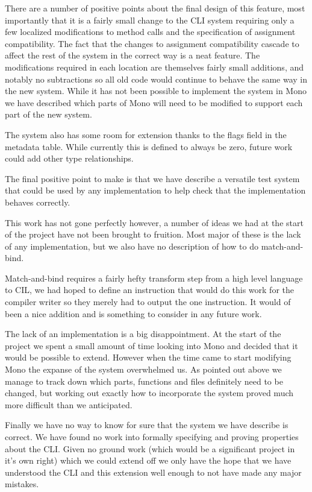 \documentclass[english]{report}
\begin{document}
There are a number of positive points about the final design of this feature, most importantly 
that it is a fairly small change to the CLI system requiring only a few localized modifications 
to method calls and the specification of assignment compatibility. The fact that the changes to
assignment compatibility cascade to affect the rest of the system in the correct way is a neat 
feature. The modifications required in each location are themselves fairly small additions, and 
notably no subtractions so all old code would continue to behave the same way in the new system.
While it has not been possible to implement the system in Mono we have described which parts of 
Mono will need to be modified to support each part of the new system.

The system also has some room for extension thanks to the flags field in the metadata table. 
While currently this is defined to always be zero, future work could add other type relationships.

The final positive point to make is that we have describe a versatile test system that could be
used by any implementation to help check that the implementation behaves correctly.

This work has not gone perfectly however, a number of ideas we had at the start of the project 
have not been brought to fruition. Most major of these is the lack of any implementation, but 
we also have no description of how to do match-and-bind.

Match-and-bind requires a fairly hefty transform step from a high level language to CIL, we had 
hoped to define an instruction that would do this work for the compiler writer so they merely had 
to output the one instruction. It would of been a nice addition and is something to consider in any
future work.

The lack of an implementation is a big disappointment. At the start of the project we spent a small amount 
of time looking into Mono and decided that it would be possible to extend. However when the time came 
to start modifying Mono the expanse of the system overwhelmed us. As pointed out above we manage to track down
which parts, functions and files definitely need to be changed, but working out exactly how to incorporate the 
system proved much more difficult than we anticipated.

Finally we have no way to know for sure that the system we have describe is correct. We have found no work 
into formally specifying and proving properties about the CLI. Given no ground work (which would be a significant
project in it's own right) which we could extend off we only have the hope that we have understood the CLI and this
extension well enough to not have made any major mistakes.
\end{document}
